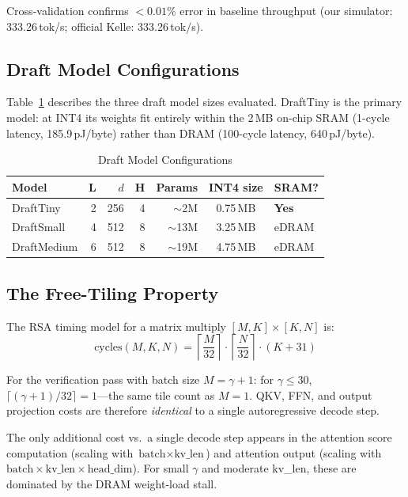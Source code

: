 \documentclass[conference]{IEEEtran}
\begin{document}
Cross-validation confirms $<0.01\%$ error in baseline throughput
(our simulator: 333.26\,tok/s; official Kelle: 333.26\,tok/s).

\subsection{Draft Model Configurations}

Table~\ref{tab:draft_models} describes the three draft model sizes evaluated.
DraftTiny is the primary model: at INT4 its weights fit entirely within the
2\,MB on-chip SRAM (1-cycle latency, 185.9\,pJ/byte) rather than DRAM
(100-cycle latency, 640\,pJ/byte).

\begin{table}[t]
  \caption{Draft Model Configurations}
  \label{tab:draft_models}
  \centering
  \small
  \begin{tabular}{lrrrrcl}
    \toprule
    \textbf{Model} & \textbf{L} & $d$ & \textbf{H} &
    \textbf{Params} & \textbf{INT4 size} & \textbf{SRAM?} \\
    \midrule
    DraftTiny   & 2 & 256 & 4 & ${\sim}$2M  & 0.75\,MB & \textbf{Yes} \\
    DraftSmall  & 4 & 512 & 8 & ${\sim}$13M & 3.25\,MB & eDRAM \\
    DraftMedium & 6 & 512 & 8 & ${\sim}$19M & 4.75\,MB & eDRAM \\
    \bottomrule
  \end{tabular}
\end{table}

\subsection{The Free-Tiling Property}

The RSA timing model for a matrix multiply $[M, K] \times [K, N]$ is:
\begin{equation}
  \text{cycles}(M, K, N) =
  \left\lceil\frac{M}{32}\right\rceil
  \cdot \left\lceil\frac{N}{32}\right\rceil
  \cdot (K + 31)
  \label{eq:rsa_cycles}
\end{equation}

For the verification pass with batch size $M = \gamma{+}1$:
for $\gamma \le 30$, $\lceil(\gamma{+}1)/32\rceil = 1$---the same tile count
as $M = 1$.
QKV, FFN, and output projection costs are therefore \emph{identical} to a
single autoregressive decode step.

The only additional cost vs.\ a single decode step appears in the attention
score computation (scaling with $\text{batch} \times \text{kv\_len}$) and
attention output (scaling with $\text{batch} \times \text{kv\_len} \times
\text{head\_dim}$).
For small $\gamma$ and moderate kv\_len, these are dominated by the DRAM
weight-load stall.
\end{document}
